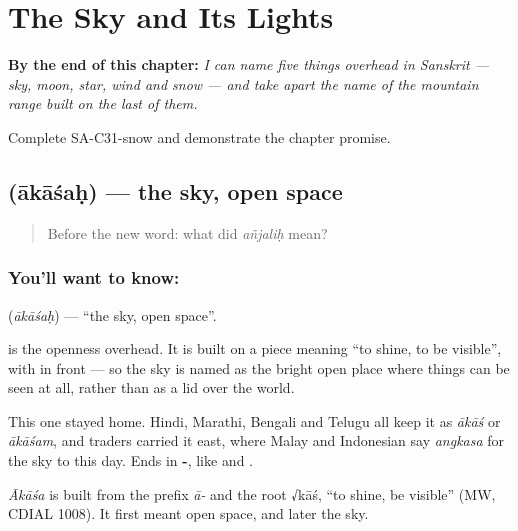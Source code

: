 
\chapter{The Sky and Its Lights}
\label{ch:sa-sky}

\begin{chapteropening}
\textbf{By the end of this chapter:} \emph{I can name five things overhead in Sanskrit --- sky, moon, star, wind and snow --- and take apart the name of the mountain range built on the last of them.}

Complete SA-C31-snow and demonstrate the chapter promise.
\end{chapteropening}

\section[\texorpdfstring{\sk{आकाशः} (ākāśaḥ)}{आकाशः (ākāśaḥ)}]{ (ākāśaḥ) — the sky, open space}

\label{lesson:SA-C31-sky}



\begin{quote}
Before the new word: what did \emph{añjaliḥ} mean?
\end{quote}

\subsection*{You'll want to know: }
\textbf{} (\emph{ākāśaḥ}) — \textquotedblleft{}the sky, open space\textquotedblright{}.

\textbf{} is the openness overhead. It is built on a piece meaning \textquotedblleft{}to shine, to be visible\textquotedblright{}, with \textbf{} in front — so the sky is named as the bright open place where things can be seen at all, rather than as a lid over the world.

This one stayed home. Hindi, Marathi, Bengali and Telugu all keep it as \emph{ākāś} or \emph{ākāśam}, and traders carried it east, where Malay and Indonesian say \emph{angkasa} for the sky to this day. Ends in \textbf{-}, like \textbf{} and \textbf{}.

\begin{cousinweb}
\emph{Ākāśa} is built from the prefix \emph{ā-} and the root √kāś, \textquotedblleft{}to shine, be visible\textquotedblright{} (MW, CDIAL 1008). It first meant open space, and later the sky.
\end{cousinweb}

